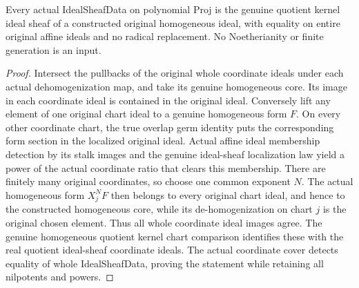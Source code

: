 \begin{theorem}
\label{projective:actual-homogeneous-ideal-sheaf-representation}
\leanok
{}
Every actual IdealSheafData on polynomial Proj is the genuine quotient kernel
ideal sheaf of a constructed original homogeneous ideal, with equality on
entire original affine ideals and no radical replacement. No Noetherianity or
finite generation is an input.
\end{theorem}
\begin{proof}
Intersect the pullbacks of the original whole coordinate ideals under each
actual dehomogenization map, and take its genuine homogeneous core. Its image
in each coordinate ideal is contained in the original ideal. Conversely lift
any element of one original chart ideal to a genuine homogeneous form $F$.
On every other coordinate chart, the true overlap germ identity puts the
corresponding form section in the localized original ideal. Actual affine
ideal membership detection by its stalk images and the genuine ideal-sheaf
localization law yield a power of the actual coordinate ratio that clears this
membership. There are finitely many original coordinates, so choose one common
exponent $N$. The actual homogeneous form $X_j^N F$ then belongs to every
original chart ideal, and hence to the constructed homogeneous core, while its
de-homogenization on chart $j$ is the original chosen element. Thus all whole
coordinate ideal images agree. The genuine homogeneous quotient kernel chart
comparison identifies these with the real quotient ideal-sheaf coordinate
ideals. The actual coordinate cover detects equality of whole IdealSheafData,
proving the statement while retaining all nilpotents and powers.
\end{proof}
